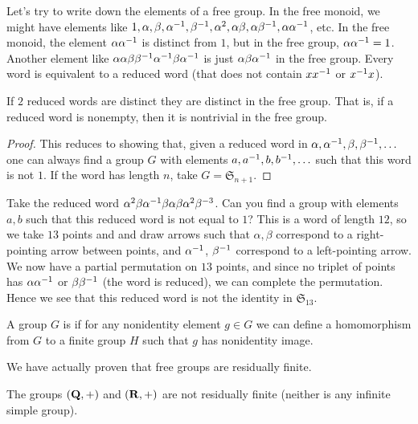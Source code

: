 \documentclass[11pt, twoside]{amsart}
\begin{document}
Let's try to write down the elements of a free group. In the free monoid, we might have elements like $1,\alpha,\beta,\alpha^{-1},\beta^{-1},\alpha^2,\alpha\beta,\alpha\beta^{-1}, \alpha\alpha^{-1}$, etc. In the free monoid, the element $\alpha\alpha^{-1}$ is distinct from $1$, but in the free group, $\alpha\alpha^{-1} =1$. Another element like $\alpha\alpha\beta\beta^{-1} \alpha^{-1}\beta\alpha^{-1}$ is just $\alpha\beta\alpha^{-1}$ in the free group. Every word is equivalent to a reduced word (that does not contain $xx^{-1}$ or $x^{-1} x$). 

\begin{proposition}
If $2$ reduced words are distinct they are distinct in the free group. That is, if a reduced word is nonempty, then it is nontrivial in the free group.
\end{proposition}
\begin{proof}
This reduces to showing that, given a reduced word in $\alpha,\alpha^{-1},\beta,\beta^{-1},\hdots$ one can always find a group $G$ with elements $a,a^{-1},b,b^{-1},\hdots$ such that this word is not $1$. If the word has length $n$, take $G=\mathfrak{S}_{n+1}$.
\end{proof}
\begin{example} %
Take the reduced word $\alpha^2\beta\alpha^{-1}\beta\alpha\beta\alpha^2\beta^{-3}$. Can you find a group with elements $a,b$ such that this reduced word is not equal to $1$? This is a word of length $12$, so we take $13$ points and and draw arrows such that $\alpha,\beta$ correspond to a right-pointing arrow between points, and $\alpha^{-1}$, $\beta^{-1}$ correspond to a left-pointing arrow. We now have a partial permutation on $13$ points, and since no triplet of points has $\alpha\alpha^{-1}$ or $\beta\beta^{-1}$ (the word is reduced), we can complete the permutation. Hence we see that this reduced word is not the identity in $\mathfrak{S}_{13}$.
\end{example}

\begin{definition}
A group $G$ is  if for any nonidentity element $g\in G$ we can define a homomorphism from $G$ to a finite group $H$ such that $g$ has nonidentity image.
\end{definition}

We have actually proven that free groups are residually finite. 
\begin{example}
The groups $(\mathbf Q,+)$ and $(\mathbf R,+)$ are not residually finite (neither is any infinite simple group).
\end{example}
\end{document}
